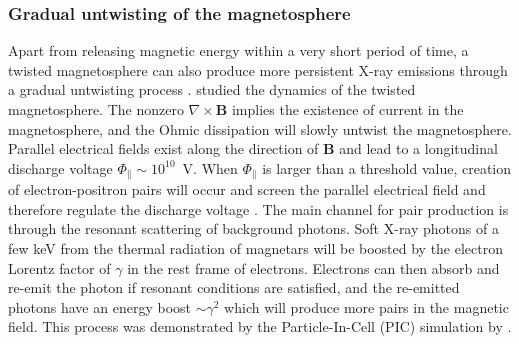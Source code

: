 \subsubsection{Gradual untwisting of the magnetosphere}

Apart from releasing magnetic energy within a very short period of time, a twisted magnetosphere can also produce more persistent X-ray emissions through a gradual untwisting process \citep{2002ApJ...574..332T, 2009ApJ...703.1044B}.
\citet{2009ApJ...703.1044B} studied the dynamics of the twisted magnetosphere.
The nonzero $\nabla\times \boldsymbol{B}$ implies the existence of current in the magnetosphere, and the Ohmic dissipation will slowly untwist the magnetosphere.
Parallel electrical fields exist along the direction of $\boldsymbol{B}$ and lead to a longitudinal discharge voltage $\Phi_{\parallel}\sim 10^{10}$~V.
When $\Phi_{\parallel}$ is larger than a threshold value, creation of electron-positron pairs will occur and screen the parallel electrical field and therefore regulate the discharge voltage \citep{2007ApJ...657..967B}.
The main channel for pair production is through the resonant scattering of background photons.
Soft X-ray photons of a few keV from the thermal radiation of magnetars will be boosted by the electron Lorentz factor of $\gamma$ in the rest frame of electrons.
Electrons can then absorb and re-emit the photon if resonant conditions are satisfied, and the re-emitted photons have an energy boost $\sim \gamma^2$ which will produce more pairs in the magnetic field.
This process was demonstrated by the Particle-In-Cell (PIC) simulation by \citet{2017ApJ...844..133C}.

